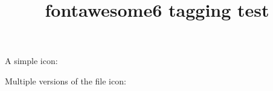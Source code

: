 \documentclass{article}
\title{fontawesome6 tagging test}
\begin{document}
A simple icon: \faHandPointUp

Multiple versions of the file icon:

\faFile

\faFile*

\faFile[regular]
\end{document}
